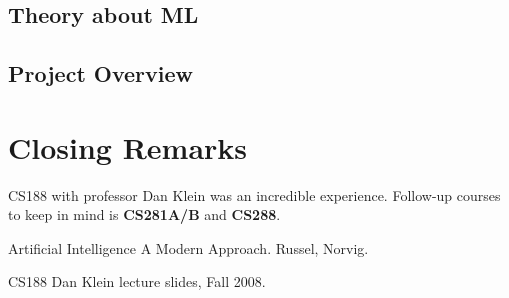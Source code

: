 \documentclass[]{article}
\begin{document}
\subsection{Theory about ML}

\subsection{Project Overview}

\pagebreak

\section{Closing Remarks}

CS188 with professor Dan Klein was an incredible experience. Follow-up courses to keep in mind is \textbf{CS281A/B} and \textbf{CS288}.




Artificial Intelligence A Modern Approach. Russel, Norvig. 

CS188 Dan Klein lecture slides, Fall 2008.
\end{document}

